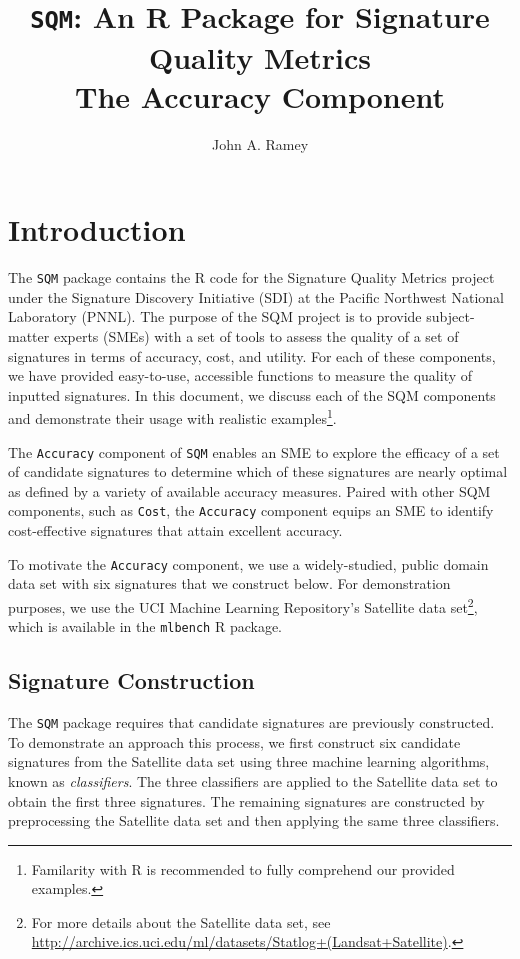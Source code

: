 \documentclass{article}
\title{{\tt SQM}: An R Package for Signature Quality Metrics\\The Accuracy Component}
\author{John A. Ramey}
\begin{document}
\maketitle

\section{Introduction}

The {\tt SQM} package contains the R code for the Signature Quality Metrics project
under the Signature Discovery Initiative (SDI) at the Pacific Northwest National
Laboratory (PNNL). The purpose of the SQM project is to provide subject-matter
experts (SMEs) with a set of tools to assess the quality of a set of signatures
in terms of accuracy, cost, and utility. For each of these components, we
have provided easy-to-use, accessible functions to measure the quality of
inputted signatures. In this document, we discuss each of the SQM components
and demonstrate their usage with realistic examples\footnote{Familarity with R
is recommended to fully comprehend our provided examples.}.

The {\tt Accuracy} component of {\tt SQM} enables an SME to explore the efficacy
of a set of candidate signatures to determine which of these signatures are
nearly optimal as defined by a variety of available accuracy measures. Paired
with other SQM components, such as {\tt Cost}, the {\tt Accuracy} component
equips an SME to identify cost-effective signatures that attain excellent
accuracy.

To motivate the {\tt Accuracy} component, we use a widely-studied, public domain
data set with six signatures that we construct below. For demonstration purposes,
we use the UCI Machine Learning Repository's Satellite data set\footnote{For more
details about the Satellite data set, see
\url{http://archive.ics.uci.edu/ml/datasets/Statlog+(Landsat+Satellite)}.},
which is available in the {\tt mlbench} R package. 

\subsection{Signature Construction}

The {\tt SQM} package requires that candidate signatures are previously
constructed. To demonstrate an approach this process, we first construct six
candidate signatures from the Satellite data set using three machine learning
algorithms, known as \emph{classifiers}. The three classifiers are applied to the
Satellite data set to obtain the first three signatures. The remaining signatures
are constructed by preprocessing the Satellite data set and then applying the
same three classifiers.
\end{document}
